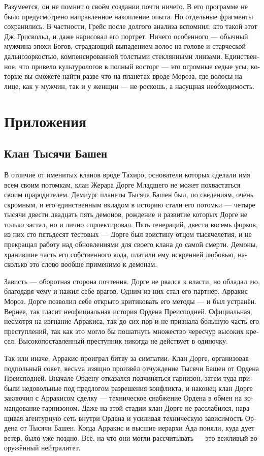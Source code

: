\documentclass[a4paper,12pt,fleqn]{book}\usepackage{polyglossia}\setdefaultlanguage[babelshorthands=true]{russian}\setotherlanguage{english}\defaultfontfeatures{Ligatures=TeX,Mapping=tex-text}\usepackage{xcolor}\newcommand{\ml}[3]{#2}
\begin{document}
{Разумеется, он не помнит о своём создании почти ничего.
В его программе не было предусмотрено направленное накопление опыта.
Но отдельные фрагменты сохранились.
В частности, Грейс после долгого анализа вспомнил, кто такой этот Дж.\,Грисвольд, и даже нарисовал его портрет.
Ничего особенного --- обычный мужчина эпохи Богов, страдающий выпадением волос на голове и старческой дальнозоркостью, компенсированной толстыми стеклянными линзами.
Единственное, что привело культурологов в полный восторг --- это огромные седые усы, которые вы сможете найти разве что на планетах вроде Мороза, где волосы на лице, как у мужчин, так и у женщин --- не роскошь, а насущная необходимость.

\chapter{Приложения}

\section{Клан Тысячи Башен}

В отличие от именитых кланов вроде Тахиро, основатели которых сделали имя всем своим потомкам, клан Жерара Дорге Младшего не может похвастаться своим прародителем.
Демиург планеты Тысяча Башен был, по сведениям, очень скромным, и его единственным вкладом в историю стали его потомки --- четыре тысячи двести двадцать пять демонов, рождение и развитие которых Дорге не только застал, но и лично спроектировал. Пять генераций, двести восемь форков, из них сто пятьдесят тестовых --- Дорге был воистину отцом тысячелетия, и не прекращал работу над обновлениями для своего клана до самой смерти. Демоны, хранившие часть его собственного кода, платили ему искренней любовью, насколько это слово вообще применимо к демонам.

Зависть --- оборотная сторона почтения.
Дорге не рвался к власти, но обладал ею, благодаря чему и нажил себе врагов.
Одним из них стал его партнёр, Арракис Мороз.
Дорге позволил себе открыто критиковать его методы --- и был устранён.
Вернее, так гласит неофициальная история Ордена Преисподней.
Официальная, несмотря на изгнание Арракиса, так до сих пор и не признала большую часть его преступлений, так как это могло бы пошатнуть множество чересчур высоких кресел.
Высокопоставленный преступник никогда не действует в одиночку.

Так или иначе, Арракис проиграл битву за симпатии.
Клан Дорге, организовав подпольный совет, весьма изящно произвёл отчуждение Тысячи Башен от Ордена Преисподней.
Вначале Ордену отказался подчиняться гарнизон, затем туда прибыли недовольные под предлогом разрешения конфликта, и наконец клан Дорге заключил с Арракисом сделку --- техническое снабжение Ордена в обмен на командование гарнизоном.
Даже на этой стадии клан Дорге не расслабился, наращивая агентурную сеть внутри Ордена и усиливая техническую зависимость Ордена от Тысячи Башен.
Когда Арракис и высшие иерархи Ада поняли, куда дует ветер, было уже поздно.
Всё, на что они могли рассчитывать --- это вежливый вооружённый нейтралитет.

}
\end{document}

